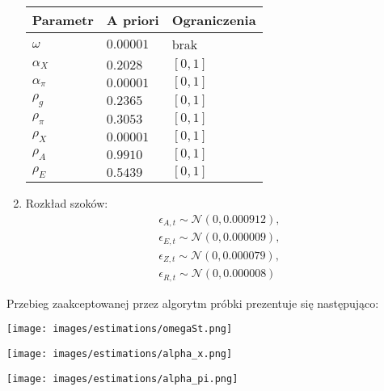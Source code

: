 \begin{enumerate}
\begin{center}
            \begin{tabular}{|p{}|p{}|p{}|}
                \hline
                Parametr & A priori & Ograniczenia\\
                \hline 
                $\omega$ & $0.00001$ & brak\\
                $\alpha_X$ & $0.2028$ & $[0,1]$\\
                $\alpha_\pi$ & $0.00001$ & $[0,1]$ \\
                $\rho_g$ & $0.2365$ & $[0,1]$ \\
                $\rho_\pi$ & $0.3053$ & $[0,1]$ \\
                $\rho_X$ & $0.00001$ & $[0,1]$ \\
                $\rho_A$ & $0.9910$ & $[0,1]$ \\
                $\rho_E$ & $0.5439$ & $[0,1]$ \\
                \hline 
            \end{tabular} 
         \end{center}
    \item Rozkład szoków:
    \begin{gather}
        \epsilon_{A,t} \sim  \mathcal{N}(0, 0.000912),\\
        \epsilon_{E,t} \sim  \mathcal{N}(0, 0.000009),\\
        \epsilon_{Z,t} \sim  \mathcal{N}(0, 0.000079),\\
        \epsilon_{R,t} \sim  \mathcal{N}(0, 0.000008)
    \end{gather}
\end{enumerate}

Przebieg zaakceptowanej przez algorytm próbki prezentuje się następująco:

\begin{center}
    \begin{minipage}{.3\textwidth}
      \centering
      \captionsetup{type=figure}
      \texttt{[image: images/estimations/omegaSt.png]}
      \label{fig:estimation:omega}
    \end{minipage}%
    \begin{minipage}{.3\textwidth}
      \centering
      \captionsetup{type=figure}
      \texttt{[image: images/estimations/alpha\_x.png]}
      \label{fig:estimation:alpha_x}
    \end{minipage}
    \begin{minipage}{.3\textwidth}
      \centering
      \captionsetup{type=figure}
      \texttt{[image: images/estimations/alpha\_pi.png]}
      \label{fig:estimation:alpha_pi}
    \end{minipage}
\end{center}


